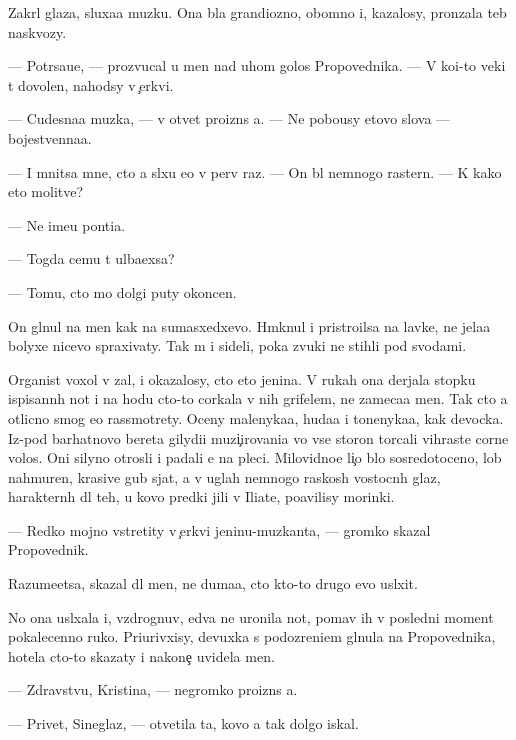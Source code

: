 \documentclass[10pt]{book}
\begin{document}
Zakr{\yi}l glaza, sluxa{\y}a muz{\yi}ku. Ona b{\yi}la grandiozno{\y}, ob{\y}omno{\y} i, kazalosy, pronzala teb{\ia} naskvozy.

— Potr{\ia}sa{\y}u{\x}e, — prozvucal u men{\ia} nad uhom golos Propovednika. — V ko{\y}i-to veki t{\yi} dovolen, nahod{\ia}sy v {\c}erkvi.

— Cudesna{\y}a muz{\yi}ka, — v otvet proizn{\e}s {\y}a. — Ne pobo{\y}usy etovo slova — bojestvenna{\y}a.

— I mnitsa mne, cto {\y}a sl{\yi}xu {\y}e{\y}o v perv{\yi}{\y} raz. — On b{\yi}l nemnogo raster{\ia}n. — K kako{\y} eto molitve?

— Ne ime{\y}u pon{\ia}ti{\y}a.

— Togda cemu t{\yi} ul{\yi}ba{\y}exsa?

— Tomu, cto mo{\y} dolgi{\y} puty okoncen.

On gl{\ia}nul na men{\ia} kak na sumasxedxevo. Hm{\yi}knul i pristro{\y}ilsa na lavke, ne jela{\y}a bolyxe nicevo spraxivaty. Tak m{\yi} i sideli, poka zvuki ne stihli pod svodami.

Organist  voxol v zal, i okazalosy, cto eto jen{\x}ina. V rukah ona derjala stopku ispisann{\yi}h not i na hodu cto-to corkala v nih grifelem, ne zameca{\y}a men{\ia}. Tak cto {\y}a otlicno smog {\y}e{\y}o rassmotrety. Oceny malenyka{\y}a, huda{\y}a i tonenyka{\y}a, kak devocka. Iz-pod barhatnovo bereta gilydi{\y}i muzi{\c}irovani{\y}a vo vse storon{\yi} torcali vihrast{\yi}{\y}e corn{\yi}{\y}e volos{\yi}. Oni silyno otrosli i padali {\y}e{\y} na pleci. Milovidno{\y}e li{\c}o b{\yi}lo sosredotoceno, lob nahmuren, krasiv{\yi}{\y}e gub{\yi} sjat{\yi}, a v uglah nemnogo raskos{\yi}h vostocn{\yi}h glaz, haraktern{\yi}h dl{\ia} teh, u kovo predki jili v Iliate, po{\y}avilisy mor{\x}inki.

— Redko mojno vstretity v {\c}erkvi jen{\x}inu-muz{\yi}kanta, — gromko skazal Propovednik.

Razume{\y}etsa, skazal dl{\ia} men{\ia}, ne duma{\y}a, cto kto-to drugo{\y} {\y}evo usl{\yi}xit.

No ona usl{\yi}xala i, vzdrognuv, {\y}edva ne uronila not{\yi}, po{\y}mav ih v posledni{\y} moment pokalecenno{\y} ruko{\y}. Pri{\x}urivxisy, devuxka s podozreni{\y}em gl{\ia}nula na Propovednika, hotela cto-to skazaty i nakone{\c} uvidela men{\ia}.

— Zdravstvu{\y}, Kristina, — negromko proizn{\e}s {\y}a.

— Privet, Sineglaz{\yi}{\y}, — otvetila ta, kovo {\y}a tak dolgo iskal.
\end{document}
